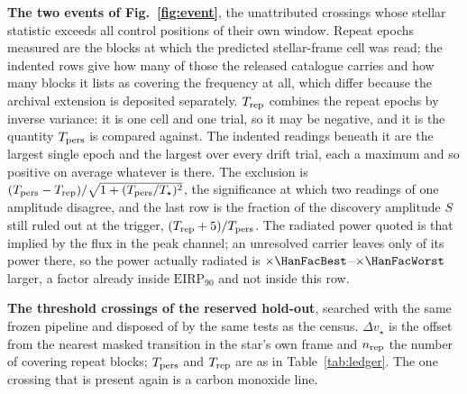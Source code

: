\begin{table}
\centering
\caption{\textbf{The two events of Fig.~\ref{fig:event}}, the unattributed
crossings whose stellar statistic exceeds all \NCtrl{} control positions of
their own window. Repeat epochs measured are the blocks at which the
predicted stellar-frame cell was read; the indented rows give how many of
those the released catalogue carries and how many blocks it lists as
covering the frequency at all, which differ because the archival extension
is deposited separately. $T_{\rm rep}$ combines the repeat epochs by inverse
variance: it is one cell and one trial, so it may be negative, and it is the
quantity $T_{\rm pers}$ is compared against. The indented readings beneath it
are the largest single epoch and the largest over every drift trial, each a
maximum and so positive on average whatever is there. The exclusion is
$(T_{\rm pers}-T_{\rm rep})/\sqrt{1+(T_{\rm pers}/T_\star)^2}$, the
significance at which two readings of one amplitude disagree, and the last row
is the fraction of the discovery amplitude $S$ still ruled out at the trigger,
$(T_{\rm rep}+5)/T_{\rm pers}$. The radiated power quoted is that implied by
the flux in the peak channel; an unresolved carrier leaves only \HanMed{} of
its power there, so the power actually radiated is
$\times\HanFacBest$--$\times\HanFacWorst$ larger, a factor already inside
$\mathrm{EIRP}_{90}$ and not inside this row.}
\label{tab:cand}
\footnotesize

\end{table}

\begin{table}
\centering
\caption{\textbf{The threshold crossings of the reserved hold-out}, searched
with the same frozen pipeline and disposed of by the same tests as the
census. $\Delta v_\star$ is the offset from the nearest masked transition in
the star's own frame and $n_{\rm rep}$ the number of covering repeat blocks;
$T_{\rm pers}$ and $T_{\rm rep}$ are as in Table~\ref{tab:ledger}. The one
crossing that is present again is a carbon monoxide line.}
\label{tab:holdout}
\scriptsize

\end{table}




